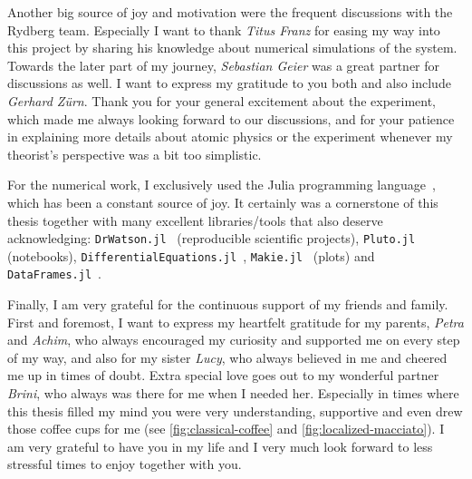 Another big source of joy and motivation were the frequent discussions with the Rydberg team. Especially I want to thank \emph{Titus Franz} for easing my way into this project by sharing his knowledge about numerical simulations of the system. Towards the later part of my journey, \emph{Sebastian Geier} was a great partner for discussions as well. I want to express my gratitude to you both and also include \emph{Gerhard Zürn}. Thank you for your general excitement about the experiment, which made me always looking forward to our discussions, and for your patience in explaining more details about atomic physics or the experiment whenever my theorist's perspective was a bit too simplistic.

For the numerical work, I exclusively used the Julia programming language~\cite{bezansonJuliaFreshApproach2017}, which has been a constant source of joy. It certainly was a cornerstone of this thesis together with many excellent libraries/tools that also deserve acknowledging: \texttt{DrWatson.jl}~\cite{datserisDrWatsonPerfectSidekick2020} (reproducible scientific projects), \texttt{Pluto.jl}~\cite{fonsvanderplasPlutoJl2024} (notebooks), \texttt{DifferentialEquations.jl}~\cite{rackauckas2017differentialequations}, \texttt{Makie.jl}~\cite{danischMakieJlFlexible2021} (plots) and \texttt{DataFrames.jl}~\cite{bouchet-valatDataframesJlFlexible2023}.

Finally, I am very grateful for the continuous support of my friends and family. First and foremost, I want to express my heartfelt gratitude for my parents, \emph{Petra} and \emph{Achim}, who always encouraged my curiosity and supported me on every step of my way, and also for my sister \emph{Lucy}, who always believed in me and cheered me up in times of doubt.
Extra special love goes out to my wonderful partner \emph{Brini}, who always was there for me when I needed her. Especially in times where this thesis filled my mind you were very understanding, supportive and even drew those coffee cups for me (see \autoref{fig:classical-coffee} and \autoref{fig:localized-macciato}).
I am very grateful to have you in my life and I very much look forward to less stressful times to enjoy together with you.

\endgroup
